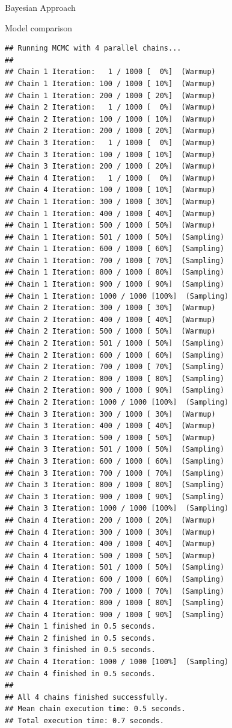 \documentclass[
  ignorenonframetext,
]{beamer}
\begin{document}
\begin{frame}[fragile]{Bayesian Approach}
\begin{block}{Model comparison}
\begin{verbatim}
## Running MCMC with 4 parallel chains...
## 
## Chain 1 Iteration:   1 / 1000 [  0%]  (Warmup) 
## Chain 1 Iteration: 100 / 1000 [ 10%]  (Warmup) 
## Chain 1 Iteration: 200 / 1000 [ 20%]  (Warmup) 
## Chain 2 Iteration:   1 / 1000 [  0%]  (Warmup) 
## Chain 2 Iteration: 100 / 1000 [ 10%]  (Warmup) 
## Chain 2 Iteration: 200 / 1000 [ 20%]  (Warmup) 
## Chain 3 Iteration:   1 / 1000 [  0%]  (Warmup) 
## Chain 3 Iteration: 100 / 1000 [ 10%]  (Warmup) 
## Chain 3 Iteration: 200 / 1000 [ 20%]  (Warmup) 
## Chain 4 Iteration:   1 / 1000 [  0%]  (Warmup) 
## Chain 4 Iteration: 100 / 1000 [ 10%]  (Warmup) 
## Chain 1 Iteration: 300 / 1000 [ 30%]  (Warmup) 
## Chain 1 Iteration: 400 / 1000 [ 40%]  (Warmup) 
## Chain 1 Iteration: 500 / 1000 [ 50%]  (Warmup) 
## Chain 1 Iteration: 501 / 1000 [ 50%]  (Sampling) 
## Chain 1 Iteration: 600 / 1000 [ 60%]  (Sampling) 
## Chain 1 Iteration: 700 / 1000 [ 70%]  (Sampling) 
## Chain 1 Iteration: 800 / 1000 [ 80%]  (Sampling) 
## Chain 1 Iteration: 900 / 1000 [ 90%]  (Sampling) 
## Chain 1 Iteration: 1000 / 1000 [100%]  (Sampling) 
## Chain 2 Iteration: 300 / 1000 [ 30%]  (Warmup) 
## Chain 2 Iteration: 400 / 1000 [ 40%]  (Warmup) 
## Chain 2 Iteration: 500 / 1000 [ 50%]  (Warmup) 
## Chain 2 Iteration: 501 / 1000 [ 50%]  (Sampling) 
## Chain 2 Iteration: 600 / 1000 [ 60%]  (Sampling) 
## Chain 2 Iteration: 700 / 1000 [ 70%]  (Sampling) 
## Chain 2 Iteration: 800 / 1000 [ 80%]  (Sampling) 
## Chain 2 Iteration: 900 / 1000 [ 90%]  (Sampling) 
## Chain 2 Iteration: 1000 / 1000 [100%]  (Sampling) 
## Chain 3 Iteration: 300 / 1000 [ 30%]  (Warmup) 
## Chain 3 Iteration: 400 / 1000 [ 40%]  (Warmup) 
## Chain 3 Iteration: 500 / 1000 [ 50%]  (Warmup) 
## Chain 3 Iteration: 501 / 1000 [ 50%]  (Sampling) 
## Chain 3 Iteration: 600 / 1000 [ 60%]  (Sampling) 
## Chain 3 Iteration: 700 / 1000 [ 70%]  (Sampling) 
## Chain 3 Iteration: 800 / 1000 [ 80%]  (Sampling) 
## Chain 3 Iteration: 900 / 1000 [ 90%]  (Sampling) 
## Chain 3 Iteration: 1000 / 1000 [100%]  (Sampling) 
## Chain 4 Iteration: 200 / 1000 [ 20%]  (Warmup) 
## Chain 4 Iteration: 300 / 1000 [ 30%]  (Warmup) 
## Chain 4 Iteration: 400 / 1000 [ 40%]  (Warmup) 
## Chain 4 Iteration: 500 / 1000 [ 50%]  (Warmup) 
## Chain 4 Iteration: 501 / 1000 [ 50%]  (Sampling) 
## Chain 4 Iteration: 600 / 1000 [ 60%]  (Sampling) 
## Chain 4 Iteration: 700 / 1000 [ 70%]  (Sampling) 
## Chain 4 Iteration: 800 / 1000 [ 80%]  (Sampling) 
## Chain 4 Iteration: 900 / 1000 [ 90%]  (Sampling) 
## Chain 1 finished in 0.5 seconds.
## Chain 2 finished in 0.5 seconds.
## Chain 3 finished in 0.5 seconds.
## Chain 4 Iteration: 1000 / 1000 [100%]  (Sampling) 
## Chain 4 finished in 0.5 seconds.
## 
## All 4 chains finished successfully.
## Mean chain execution time: 0.5 seconds.
## Total execution time: 0.7 seconds.
\end{verbatim}


\end{block}
\end{frame}
\end{document}
